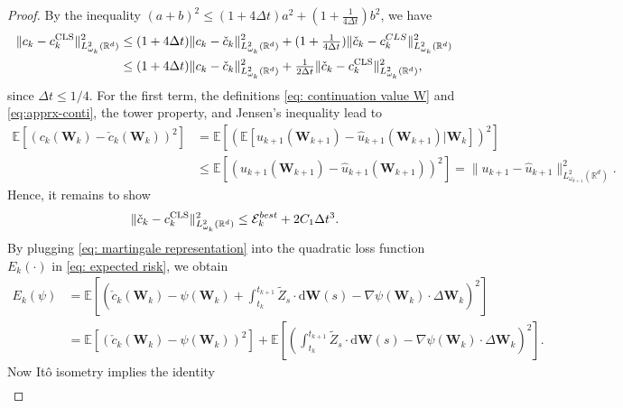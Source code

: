 \documentclass[10pt,a4paper]{amsart}
\numberwithin{equation}{section}
\numberwithin{algorithm}{section}
\theoremstyle{plain}
\theoremstyle{remark}
\newcommand{\op}{\operatorname}
\newcommand{\R}{\mathbb{R}}
\newcommand{\dd}{\mathrm{d}}
\begin{document}
\begin{proof}
By the inequality $(a+b)^2 \le (1+ 4 \Delta t) a^2 + (1+\frac{1}{4 \Delta t})b^2$, we have
\begin{align*}
    \|c_k - c_k^{\op{CLS}}\|_{{L}^2_{\omega_k}(\R^d)}^2 &\le (1+4 \Delta t) \|c_k - \check{c}_k\|_{{L}^2_{\omega_k}(\R^d)}^2 + (1+\tfrac{1}{4\Delta t}) \|\check{c}_k - c_k^{\rm CLS}\|_{{L}^2_{\omega_k}(\R^d)}^2 \\
    &\le (1+4 \Delta t) \|c_k - \check{c}_k\|_{{L}^2_{\omega_k}(\R^d)}^2 + \tfrac{1}{2\Delta t} \|\check{c}_k - c_k^{\op{CLS}}\|_{{L}^2_{\omega_k}(\R^d)}^2,
\end{align*}
since $\Delta t \le 1/4$. For the first term, the definitions \cref{eq: continuation value W} and \cref{eq:apprx-conti}, the tower property, and Jensen's inequality lead to
\begin{equation*}
\begin{aligned}
    \mathbb{E}\left[ \left( c_k(\mathbf{W}_k) - \check{c}_k(\mathbf{W}_k) \right)^2 \right] &= \mathbb{E}\left[ \left(\mathbb{E}\left[ u_{k+1}(\mathbf{W}_{k+1}) - \hat{u}_{k+1}(\mathbf{W}_{k+1})|\mathbf{W}_k \right] \right)^2 \right] \\
    &\le \mathbb{E}\left[ \left(u_{k+1}(\mathbf{W}_{k+1}) - \hat{u}_{k+1}(\mathbf{W}_{k+1}) \right)^2 \right] = \|u_{k+1} - \hat{u}_{k+1}\|_{{L}^2_{\omega_{k+1}}(\R^d)}^2.
\end{aligned}
\end{equation*}
Hence, it remains to show
\begin{equation} \label{eq:remains-to-show}
    \|\check{c}_k - c_k^{\op{CLS}}\|_{{L}^2_{ \omega_{k}}(\R^d)}^2 \le \mathcal{E}_k^{\rm best} + 2C_1\Delta t^3.
\end{equation}
By plugging \cref{eq: martingale representation} into the quadratic loss function $E_k(\cdot)$ in \cref{eq: expected risk}, we obtain
\begin{align*}
    E_k(\psi) &= \mathbb{E}\left[ \left( \check{c}_k(\mathbf{W}_k) - \psi(\mathbf{W}_k) + \int_{t_k}^{t_{k+1}} \tilde{Z}_s\cdot \dd \mathbf{W}(s) - \nabla \psi(\mathbf{W}_k)\cdot \Delta \mathbf{W}_k \right)^2 \right] \\
    &= \mathbb{E}\left[ \left( \check{c}_k(\mathbf{W}_k) - \psi(\mathbf{W}_k) \right)^2 \right] + \mathbb{E}\left[ \left( \int_{t_k}^{t_{k+1}} \tilde{Z}_s\cdot \dd \mathbf{W}(s) - \nabla \psi(\mathbf{W}_k)\cdot \Delta \mathbf{W}_k \right)^2 \right].
\end{align*}
Now It\^{o} isometry implies the identity
\begin{align*}

\end{align*}
\end{proof}
\end{document}
